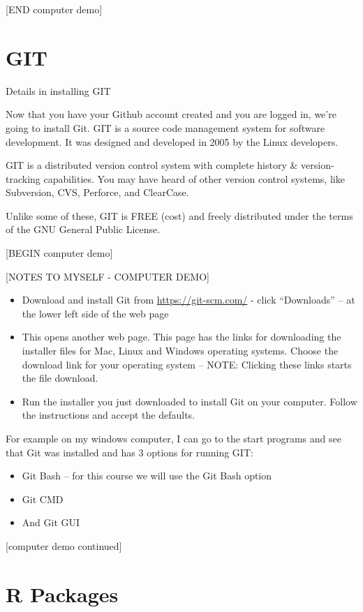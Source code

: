 \documentclass[]{book}
\providecommand{\tightlist}{%
  \setlength{\itemsep}{0pt}\setlength{\parskip}{0pt}}
\theoremstyle{definition}
\theoremstyle{definition}
\theoremstyle{definition}
\theoremstyle{remark}
\begin{document}
{[}END computer demo{]}

\section{GIT}\label{git}

Details in installing GIT

Now that you have your Github account created and you are logged in,
we're going to install Git. GIT is a source code management system for
software development. It was designed and developed in 2005 by the Linux
developers.

GIT is a distributed version control system with complete history \&
version-tracking capabilities. You may have heard of other version
control systems, like Subversion, CVS, Perforce, and ClearCase.

Unlike some of these, GIT is FREE (cost) and freely distributed under
the terms of the GNU General Public License.

{[}BEGIN computer demo{]}

{[}NOTES TO MYSELF - COMPUTER DEMO{]}

\begin{itemize}
\tightlist
\item
  Download and install Git from \url{https://git-scm.com/} - click
  ``Downloads'' -- at the lower left side of the web page
\item
  This opens another web page. This page has the links for downloading
  the installer files for Mac, Linux and Windows operating systems.
  Choose the download link for your operating system -- NOTE: Clicking
  these links starts the file download.
\item
  Run the installer you just downloaded to install Git on your computer.
  Follow the instructions and accept the defaults.
\end{itemize}

For example on my windows computer, I can go to the start programs and
see that Git was installed and has 3 options for running GIT:

\begin{itemize}
\tightlist
\item
  Git Bash -- for this course we will use the Git Bash option
\item
  Git CMD
\item
  And Git GUI
\end{itemize}

{[}computer demo continued{]}

\section{R Packages}\label{r-packages}
\end{document}
